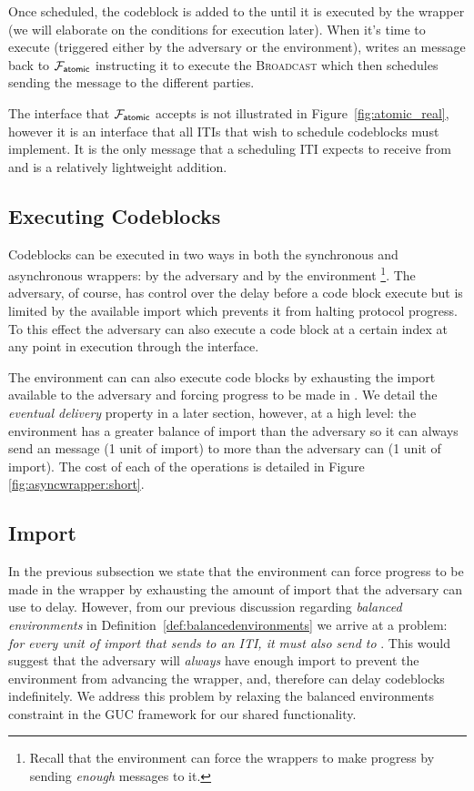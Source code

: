 Once scheduled, the codeblock is added to the  until it is executed by the wrapper (we will elaborate on the conditions for execution later).
When it's time to execute (triggered either by the adversary or the environment), \Wasync writes an \Exec message back to $\mathcal{F}_{{\mathsf {atomic}}}$ instructing it to execute the \textsc{Broadcast} which then schedules sending the message to the different parties. 

The \Exec interface that $\mathcal{F}_{{\mathsf {atomic}}}$ accepts is not illustrated in Figure~\ref{fig:atomic_real}, however it is an interface that all ITIs that wish to schedule codeblocks must implement.
It is the only message that a scheduling ITI expects to receive from \Wasync and is a relatively lightweight addition. 

\subsection{Executing Codeblocks}
Codeblocks can be executed in two ways in both the synchronous and asynchronous wrappers: by the adversary and by the environment \footnote{Recall that the environment can force the wrappers to make progress by sending {\em enough} \Advance messages to it.}.
The adversary, of course, has control over the delay before a code block execute but is limited by the available import which prevents it from halting protocol progress.
To this effect the adversary can also execute a code block at a certain index at any point in execution through the \Exec interface.

The environment can can also execute code blocks by exhausting the import available to the adversary and forcing progress to be made in \Wasync.
We detail the {\em eventual delivery} property in a later section, however, at a high level: the environment has a greater balance of import than the adversary so it can always send an \Advance message (1 unit of import) to \Wasync more than the adversary can \Delay (1 unit of import).
The cost of each of the operations is detailed in Figure \ref{fig:asyncwrapper:short}.


\subsection{Import}
In the previous subsection we state that the environment can force progress to be made in the wrapper by exhausting the amount of import that the adversary can use to delay.
However, from our previous discussion regarding \textit{balanced environments} in Definition~\ref{def:balancedenvironments} we arrive at a problem: \textit{for every unit of import that \Environment sends to an ITI, it must also send to \Adversary}.
This would suggest that the adversary will \textit{always} have enough import to prevent the environment from advancing the wrapper, and, therefore \Adversary can delay codeblocks indefinitely.
We address this problem by relaxing the balanced environments constraint in the GUC framework for our shared functionality.

